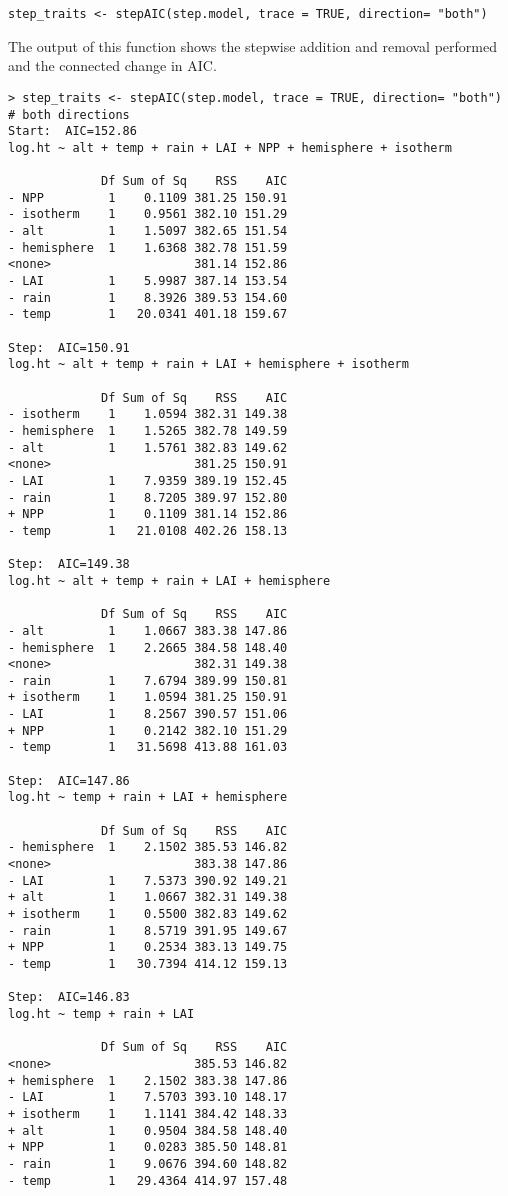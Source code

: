 \documentclass[
]{article}
\begin{document}
\begin{verbatim}
step_traits <- stepAIC(step.model, trace = TRUE, direction= "both")
\end{verbatim}

The output of this function shows the stepwise addition and removal
performed and the connected change in AIC.

\begin{verbatim}
> step_traits <- stepAIC(step.model, trace = TRUE, direction= "both")    # both directions
Start:  AIC=152.86
log.ht ~ alt + temp + rain + LAI + NPP + hemisphere + isotherm

             Df Sum of Sq    RSS    AIC
- NPP         1    0.1109 381.25 150.91
- isotherm    1    0.9561 382.10 151.29
- alt         1    1.5097 382.65 151.54
- hemisphere  1    1.6368 382.78 151.59
<none>                    381.14 152.86
- LAI         1    5.9987 387.14 153.54
- rain        1    8.3926 389.53 154.60
- temp        1   20.0341 401.18 159.67

Step:  AIC=150.91
log.ht ~ alt + temp + rain + LAI + hemisphere + isotherm

             Df Sum of Sq    RSS    AIC
- isotherm    1    1.0594 382.31 149.38
- hemisphere  1    1.5265 382.78 149.59
- alt         1    1.5761 382.83 149.62
<none>                    381.25 150.91
- LAI         1    7.9359 389.19 152.45
- rain        1    8.7205 389.97 152.80
+ NPP         1    0.1109 381.14 152.86
- temp        1   21.0108 402.26 158.13

Step:  AIC=149.38
log.ht ~ alt + temp + rain + LAI + hemisphere

             Df Sum of Sq    RSS    AIC
- alt         1    1.0667 383.38 147.86
- hemisphere  1    2.2665 384.58 148.40
<none>                    382.31 149.38
- rain        1    7.6794 389.99 150.81
+ isotherm    1    1.0594 381.25 150.91
- LAI         1    8.2567 390.57 151.06
+ NPP         1    0.2142 382.10 151.29
- temp        1   31.5698 413.88 161.03

Step:  AIC=147.86
log.ht ~ temp + rain + LAI + hemisphere

             Df Sum of Sq    RSS    AIC
- hemisphere  1    2.1502 385.53 146.82
<none>                    383.38 147.86
- LAI         1    7.5373 390.92 149.21
+ alt         1    1.0667 382.31 149.38
+ isotherm    1    0.5500 382.83 149.62
- rain        1    8.5719 391.95 149.67
+ NPP         1    0.2534 383.13 149.75
- temp        1   30.7394 414.12 159.13

Step:  AIC=146.83
log.ht ~ temp + rain + LAI

             Df Sum of Sq    RSS    AIC
<none>                    385.53 146.82
+ hemisphere  1    2.1502 383.38 147.86
- LAI         1    7.5703 393.10 148.17
+ isotherm    1    1.1141 384.42 148.33
+ alt         1    0.9504 384.58 148.40
+ NPP         1    0.0283 385.50 148.81
- rain        1    9.0676 394.60 148.82
- temp        1   29.4364 414.97 157.48
\end{verbatim}
\end{document}
